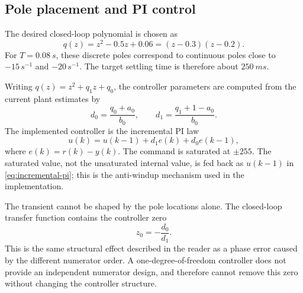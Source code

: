 \subsection{Pole placement and PI control}

The desired closed-loop polynomial is chosen as
\begin{equation}
  q(z)=z^2-0.5z+0.06=(z-0.3)(z-0.2).
  \label{eq:desired-polynomial}
\end{equation}
For \(T=\SI{0.08}{s}\), these discrete poles correspond to continuous poles
close to \(-15\,\si{s^{-1}}\) and \(-20\,\si{s^{-1}}\). The target settling
time is therefore about \(\SI{250}{ms}\).

Writing \(q(z)=z^2+q_1z+q_0\), the controller parameters are computed from the
current plant estimates by
\begin{equation}
  d_0=\frac{q_0+a_0}{b_0},
  \qquad
  d_1=\frac{q_1+1-a_0}{b_0}.
  \label{eq:pole-placement-parameters}
\end{equation}
The implemented controller is the incremental PI law
\begin{equation}
  u(k)=u(k-1)+d_1e(k)+d_0e(k-1),
  \label{eq:incremental-pi}
\end{equation}
where \(e(k)=r(k)-y(k)\). The command is saturated at \(\pm255\). The saturated
value, not the unsaturated internal value, is fed back as \(u(k-1)\) in
\eqref{eq:incremental-pi}; this is the anti-windup mechanism used in the
implementation.

The transient cannot be shaped by the pole locations alone. The closed-loop
transfer function contains the controller zero
\begin{equation}
  z_0=-\frac{d_0}{d_1}.
  \label{eq:controller-zero}
\end{equation}
This is the same structural effect described in the reader as a phase error
caused by the different numerator order. A one-degree-of-freedom controller
does not provide an independent numerator design, and therefore cannot remove
this zero without changing the controller structure.

